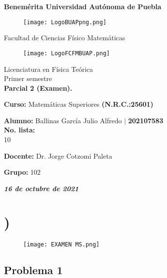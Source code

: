 \documentclass[12pt]{article}
\begin{document}
\sffamily
\thispagestyle{empty} 
\begin{center}
\LARGE{\bf Benemérita Universidad Autónoma de Puebla} \\[0.5cm]
\begin{figure}[htb] 
\centering \texttt{[image: LogoBUAPpng.png]} 
\end{figure}
\LARGE{Facultad de Ciencias Físico Matemáticas}\\[0.5cm]
\begin{figure}[htb] \centering \texttt{[image: LogoFCFMBUAP.png]} \end{figure} 
\Large{Licenciatura en Física Teórica}\\[0.5cm]
\large{Primer semestre}\\[0.5cm] 
{\Large \bfseries{Parcial 2 (Examen).}} \\[0.5cm]
\begin{center}
\hspace{0.5cm}\large{\textbf{Curso:} } Matemáticas Superiores \textbf{(N.R.C.:25601)}
\end{center}
\begin{center}
\large{\textbf{Alumno:}} Ballinas García Julio Alfredo  $\mid$  {\textbf{202107583}}\\[0.5cm]
\large{\textbf{No. lista:}} \\[0.5cm]
10
\end{center} 
\begin{center}
\hspace{0.5cm}\large{\textbf{Docente:}} Dr. Jorge Cotzomi Paleta
\end{center}
\begin{center}
\hspace{0.5cm}\large{\bf Grupo:} 102 
\end{center}
\vfill
\begin{center} 
\textsl{\textbf{ 16 de octubre de 2021}}
\end{center}  
\end{center}  

\newpage
\sffamily
\section*{{})} 


\begin{figure}[htb] 
\centering \texttt{[image: EXAMEN MS.png]} 
\end{figure}
\newpage

\subsection*{Problema 1} \vspace{0.1cm}
\end{document}
